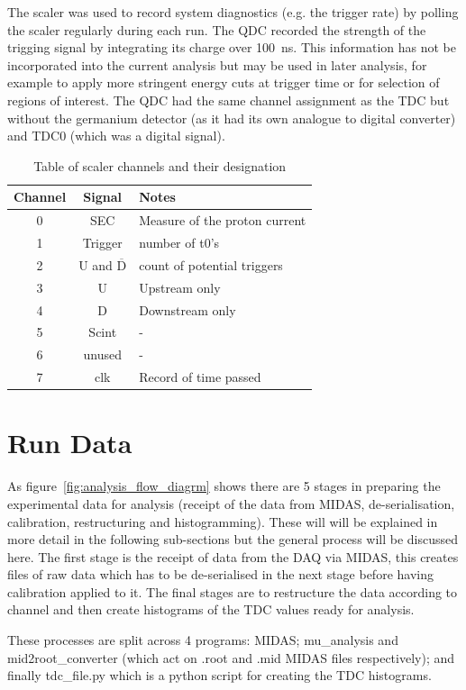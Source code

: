 The scaler was used to record system diagnostics (e.g. the trigger rate) by polling the scaler regularly during each run. The QDC recorded the strength of the trigging signal by integrating its charge over 100~ns. This information has not be incorporated into the current analysis but may be used in later analysis, for example to apply more stringent energy cuts at trigger time or for selection of regions of interest. The QDC had the same channel assignment as the TDC but without the germanium detector (as it had its own analogue to digital converter) and TDC0 (which was a digital signal).
\begin{table}
    \centering
    \begin{tabular}{c|c|l}
        Channel & Signal & Notes\\
        \hline
        0 & SEC & Measure of the proton current\\
        1 & Trigger & number of t0's\\
        2 & U and $\overline{\text{D}}$ & count of potential triggers\\
        3 & U & Upstream only\\
        4 & D & Downstream only\\
        5 & Scint & -\\
        6 & unused & -\\
        7 & clk & Record of time passed\\
    \end{tabular}
    \caption{Table of scaler channels and their designation}
    \label{tab:scaler_chs}
\end{table}
\section{Run Data} %
\label{sec:run_data}
As figure~\ref{fig:analysis_flow_diagrm} shows there are 5 stages in preparing the experimental data for analysis (receipt of the data from MIDAS, de-serialisation, calibration, restructuring and histogramming). These will will be explained in more detail in the following sub-sections but the general process will be discussed here. The first stage is the receipt of data from the DAQ via MIDAS, this creates files of raw data which has to be de-serialised in the next stage before having calibration applied to it. The final stages are to restructure the data according to channel and then create histograms of the TDC values ready for analysis. 

These processes are split across 4 programs: MIDAS; mu\_analysis and mid2root\_converter (which act on .root and .mid MIDAS files respectively); and finally tdc\_file.py which is a python script for creating the TDC histograms.

